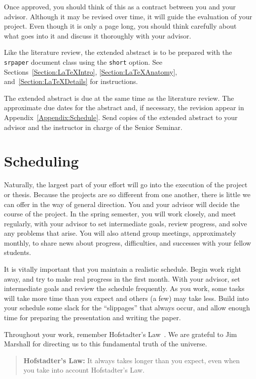 \documentclass[finalcopy]{srpaper}
\def\hyperref[#1]{}
\let\plainref\ref
\newcommand{\plainref}{\ref*}
\newcommand{\namedref}[2]{\hyperref[#2]{#1~\plainref{#2}}}
\begin{document}
Once approved, you should think of this as a contract
between you and your advisor.  Although it may be revised
over time, it will guide the evaluation of your project.
Even though it is only a page long, you should think
carefully about what goes into it and discuss it thoroughly
with your advisor.

Like the literature review, the extended abstract is to
be prepared with the \texttt{srpaper} document class
using the \texttt{short} option.%
See \namedref{Sections}{Section:LaTeXIntro},
\ref{Section:LaTeXAnatomy}, and~\ref{Section:LaTeXDetails}
for instructions.

The extended abstract is due at the same time as the 
literature review. The approximate due dates for the
abstract and, if necessary, the revision appear in
\namedref{Appendix}{Appendix:Schedule}. Send copies of
the extended abstract to your advisor and the instructor
in charge of the Senior Seminar.%


\section{Scheduling}
\label{Section:Scheduling}
Naturally, the largest part of your effort will go into the
execution of the project or thesis. Because the projects are
so different from one another, there is little we can offer
in the way of general direction. You and your
advisor will
decide the course of the project. In the spring semester,
you will work closely, and meet regularly, with your advisor
to set intermediate goals, review progress, and solve any
problems that arise. You will also attend group meetings,
approximately monthly, to share news about progress,
difficulties, and successes with your fellow students.

It is vitally important that you maintain a realistic
schedule. Begin work right away, and try to make real
progress in the first month. With your advisor, set
intermediate goals and review the schedule frequently. As
you work, some tasks will take more time than you expect and
others (a few) may take less. Build into your schedule some
slack for the ``slippages'' that always occur, and allow
enough time for preparing the presentation and writing the
paper.

Throughout your work, remember Hofstadter's
Law~\cite{HofstadterGEB}. We are grateful to Jim Marshall
for directing us to this fundamental truth of the universe.
\begin{quote}
\textbf{Hofstadter's Law:} It always takes longer than you
expect, even when you take into account Hofstadter's Law.
\end{quote}
\end{document}
